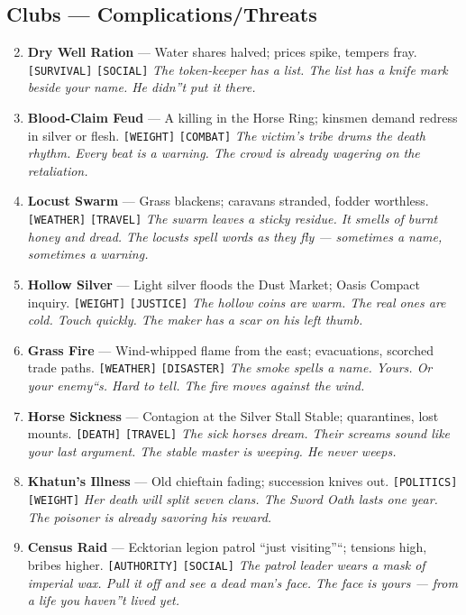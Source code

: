 {{\subsection*{Clubs --- Complications/Threats}
\label{sec:midh-ahkaz-complications}
\begin{enumerate}
\setcounter{enumi}{1}
\item {} \textbf{Dry Well Ration} --- Water shares halved; prices spike, tempers fray. \texttt{[SURVIVAL]} \texttt{[SOCIAL]} \hfill \textit{The token-keeper has a list. The list has a knife mark beside your name. He didn''t put it there.}
\item {} \textbf{Blood-Claim Feud} --- A killing in the Horse Ring; kinsmen demand redress in silver or flesh. \texttt{[WEIGHT]} \texttt{[COMBAT]} \hfill \textit{The victim's tribe drums the death rhythm. Every beat is a warning. The crowd is already wagering on the retaliation.}
\item {} \textbf{Locust Swarm} --- Grass blackens; caravans stranded, fodder worthless. \texttt{[WEATHER]} \texttt{[TRAVEL]} \hfill \textit{The swarm leaves a sticky residue. It smells of burnt honey and dread. The locusts spell words as they fly --- sometimes a name, sometimes a warning.}
\item {} \textbf{Hollow Silver} --- Light silver floods the Dust Market; Oasis Compact inquiry. \texttt{[WEIGHT]} \texttt{[JUSTICE]} \hfill \textit{The hollow coins are warm. The real ones are cold. Touch quickly. The maker has a scar on his left thumb.}
\item {} \textbf{Grass Fire} --- Wind-whipped flame from the east; evacuations, scorched trade paths. \texttt{[WEATHER]} \texttt{[DISASTER]} \hfill \textit{The smoke spells a name. Yours. Or your enemy``s. Hard to tell. The fire moves against the wind.}
\item {} \textbf{Horse Sickness} --- Contagion at the Silver Stall Stable; quarantines, lost mounts. \texttt{[DEATH]} \texttt{[TRAVEL]} \hfill \textit{The sick horses dream. Their screams sound like your last argument. The stable master is weeping. He never weeps.}
\item {} \textbf{Khatun's Illness} --- Old chieftain fading; succession knives out. \texttt{[POLITICS]} \texttt{[WEIGHT]} \hfill \textit{Her death will split seven clans. The Sword Oath lasts one year. The poisoner is already savoring his reward.}
\item {} \textbf{Census Raid} --- Ecktorian legion patrol ``just visiting''``; tensions high, bribes higher. \texttt{[AUTHORITY]} \texttt{[SOCIAL]} \hfill \textit{The patrol leader wears a mask of imperial wax. Pull it off and see a dead man's face. The face is yours --- from a life you haven''t lived yet.}

\end{enumerate}}}
